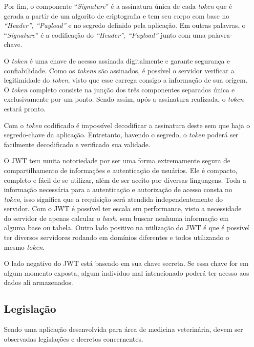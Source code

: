\documentclass[
    12pt,               %
    openright,          %
    oneside,
    a4paper,            %
    BIBLATEX,           %
    TODO,               %
    english,            %
    brazil              %
    ]{ifsp-spo-inf-ctds}
\begin{document}
            Por fim, o componente “\emph{Signature}” é a assinatura única de cada \emph{token} que é gerada a partir de um algorito de criptografia e tem seu corpo com base no \emph{“Header”, “Payload”} e no segredo definido pela aplicação. Em outras palavras, o “\emph{Signature}” é a codificação do \emph{“Header”, “Payload”} junto com uma palavra-chave.

            O \emph{token} é uma chave de acesso assinada digitalmente e garante segurança e confiabilidade. Como os \emph{tokens} são assinados, é possível o servidor verificar a legitimidade do \emph{token}, visto que esse carrega consigo a informação de sua origem. O \emph{token} completo consiste na junção dos três componentes separados única e exclusivamente por um ponto. Sendo assim, após a assinatura realizada, o  \emph{token} estará pronto. 

            Com o \emph{token} codificado é impossível decodificar a assinatura deste sem que haja o segredo-chave da aplicação. Entretanto, havendo o segredo, o \emph{token} poderá ser facilmente decodificado e verificado sua validade. 

            O JWT tem muita notoriedade por ser uma forma extremamente segura de compartilhamento de informações e autenticação de usuários. Ele é compacto, completo e fácil de se utilizar, além de ser aceito por diversas linguagens. Toda a informação necessária para a autenticação e autorização de acesso consta no \emph{token}, isso significa que a requisição será atendida independentemente do servidor. Com o JWT é possível ter escala em performance, visto a necessidade do servidor de apenas calcular o \emph{hash}, sem buscar nenhuma informação em alguma base ou tabela. Outro lado positivo na utilização do JWT é que é possível ter diversos servidores rodando em domínios diferentes e todos utilizando o mesmo \emph{token}.

            O lado negativo do JWT está baseado em sua chave secreta. Se essa chave for em algum momento exposta, algum indivíduo mal intencionado poderá ter acesso aos dados ali armazenados.


        \subsection{Legislação}

            Sendo uma aplicação desenvolvida para área de medicina veterinária, devem ser observadas legislações e decretos concernentes.
\end{document}
